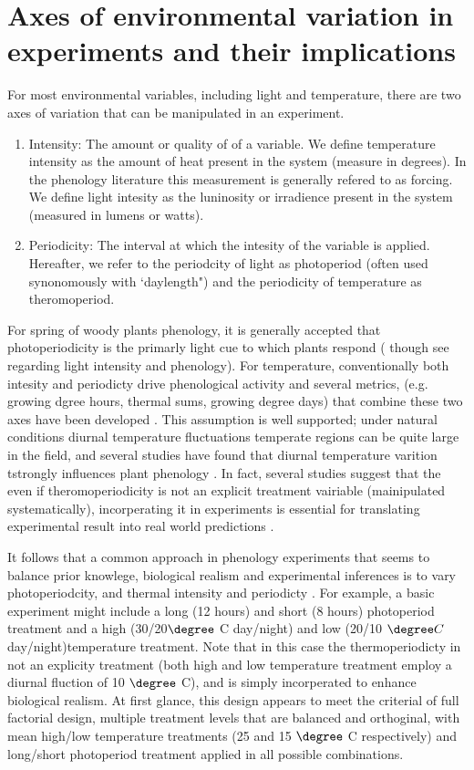 \documentclass[11pt]{article}
\begin{document}
\section{Axes of environmental variation in experiments and their implications}
For most environmental variables, including light and temperature, there are two axes of variation that can be manipulated in an experiment.  
\begin{enumerate}
\item Intensity: The amount or quality of of a variable. We define temperature intensity as the amount of heat present in the system (measure in degrees).  In the phenology literature this measurement is generally refered to as forcing. We define light intesity as the luninosity or irradience present in the system (measured in lumens or watts). 
\item Periodicity: The interval at which the intesity of the variable is applied. Hereafter, we refer to the periodcity of light as photoperiod (often used synonomously with `daylength") and the periodicity of temperature as theromoperiod. 
\end{enumerate}

For spring of woody plants phenology, it is generally accepted that photoperiodicity is the primarly light cue to which plants respond (\citep{} though see \citep{} regarding light intensity and phenology). For temperature, conventionally both intesity and periodicty drive phenological activity \citep{} and several metrics, (e.g. growing dgree hours, thermal sums, growing degree days)  that combine these two axes have been developed \citep{}. This assumption is well supported; under natural conditions diurnal temperature fluctuations temperate regions can be quite large in the field, and several studies have found that diurnal temperature varition tstrongly influences plant phenology \citep{}. In fact, several studies suggest that the even if theromoperiodicity is not an explicit treatment vairiable (mainipulated systematically), incorperating it in experiments is essential for translating experimental result into real world predictions \citep{}.

It follows that a common approach in phenology experiments that seems to balance prior knowlege, biological realism and experimental inferences is to vary photoperiodcity, and thermal intensity and periodicty \citep{}. For example, a basic experiment might include a long (12 hours) and short (8 hours) photoperiod treatment
and a high (30/20$\degree$ C day/night) and low (20/10 $\degree C$ day/night)temperature treatment. Note that in this case the thermoperiodicty in not an explicity treatment (both high and low temperature treatment employ a diurnal fluction of 10 $\degree$ C), and is simply incorperated to enhance biological realism. At first glance, this design appears to meet the criterial of full factorial design, multiple treatment levels that are balanced and orthoginal, with mean high/low temperature treatments (25 and 15 $\degree$ C respectively) and long/short photoperiod treatment applied in all possible combinations.
\end{document}
